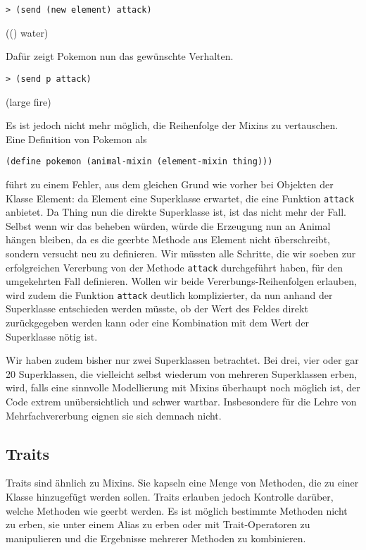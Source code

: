 \begin{lstlisting}
> (send (new element) attack)
\end{lstlisting}
{\rsymbol (() water)}

Dafür zeigt Pokemon nun das gewünschte Verhalten.
\begin{lstlisting}
> (send p attack)
\end{lstlisting}
{\rsymbol (large fire)}

Es ist jedoch nicht mehr möglich, die Reihenfolge der Mixins zu vertauschen. Eine Definition von Pokemon als

\begin{lstlisting}
(define pokemon (animal-mixin (element-mixin thing)))
\end{lstlisting}

führt zu einem Fehler, aus dem gleichen Grund wie vorher bei Objekten der Klasse Element: da Element eine Superklasse erwartet, die eine Funktion \texttt{attack} anbietet. Da Thing nun die direkte Superklasse ist, ist das nicht mehr der Fall. Selbst wenn wir das beheben würden, würde die Erzeugung nun an Animal hängen bleiben, da es die geerbte Methode aus Element nicht überschreibt, sondern versucht neu zu definieren. Wir müssten alle Schritte, die wir soeben zur erfolgreichen Vererbung von der Methode \texttt{attack} durchgeführt haben, für den umgekehrten Fall definieren. Wollen wir beide Vererbungs-Reihenfolgen erlauben, wird zudem die Funktion \texttt{attack} deutlich komplizierter, da nun anhand der Superklasse entschieden werden müsste, ob der Wert des Feldes direkt zurückgegeben werden kann oder eine Kombination mit dem Wert der Superklasse nötig ist.

Wir haben zudem bisher nur zwei Superklassen betrachtet. Bei drei, vier oder gar 20 Superklassen, die vielleicht selbst wiederum von mehreren Superklassen erben, wird, falls eine sinnvolle Modellierung mit Mixins überhaupt noch möglich ist, der Code extrem unübersichtlich und schwer wartbar. Insbesondere für die Lehre von Mehrfachvererbung eignen sie sich demnach nicht.

\subsection{Traits}
Traits sind ähnlich zu Mixins. Sie kapseln eine Menge von Methoden, die zu einer Klasse hinzugefügt werden sollen. Traits erlauben jedoch Kontrolle darüber, welche Methoden wie geerbt werden. Es ist möglich bestimmte Methoden nicht zu erben, sie unter einem Alias zu erben oder mit Trait-Operatoren zu manipulieren und die Ergebnisse mehrerer Methoden zu kombinieren.

